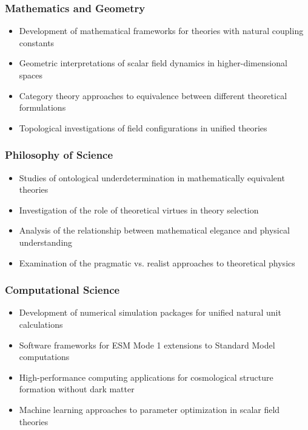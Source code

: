 \documentclass[12pt,a4paper]{article}
\begin{document}
	\subsubsection{Mathematics and Geometry}
	\label{subsubsec:mathematics_geometry}
	
	\begin{itemize}
		\item Development of mathematical frameworks for theories with natural coupling constants
		\item Geometric interpretations of scalar field dynamics in higher-dimensional spaces
		\item Category theory approaches to equivalence between different theoretical formulations
		\item Topological investigations of field configurations in unified theories
	\end{itemize}
	
	\subsubsection{Philosophy of Science}
	\label{subsubsec:philosophy_science}
	
	\begin{itemize}
		\item Studies of ontological underdetermination in mathematically equivalent theories \cite{Duhem1906,Quine1951}
		\item Investigation of the role of theoretical virtues in theory selection \cite{Kuhn1977}
		\item Analysis of the relationship between mathematical elegance and physical understanding
		\item Examination of the pragmatic vs. realist approaches to theoretical physics \cite{vanFraassen1980}
	\end{itemize}
	
	\subsubsection{Computational Science}
	\label{subsubsec:computational_science}
	
	\begin{itemize}
		\item Development of numerical simulation packages for unified natural unit calculations
		\item Software frameworks for ESM Mode 1 extensions to Standard Model computations
		\item High-performance computing applications for cosmological structure formation without dark matter
		\item Machine learning approaches to parameter optimization in scalar field theories
	\end{itemize}
	
\end{document}
